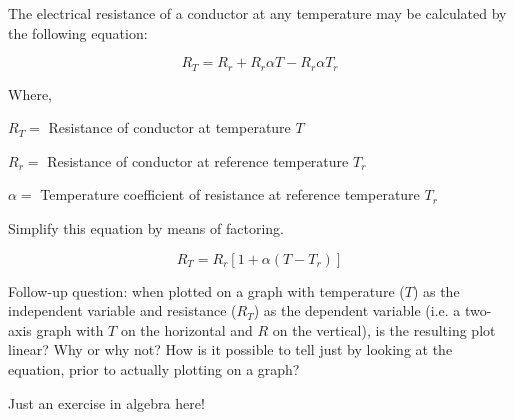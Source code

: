 

The electrical resistance of a conductor at any temperature may be calculated by the following equation:

$$R_T = R_r + R_r \alpha T - R_r \alpha T_r$$

\noindent
Where,

$R_T =$ Resistance of conductor at temperature $T$

$R_r =$ Resistance of conductor at reference temperature $T_r$

$\alpha =$ Temperature coefficient of resistance at reference temperature $T_r$

\vskip 10pt

Simplify this equation by means of factoring.







$$R_T = R_r [1 + \alpha(T - T_r)]$$

\vskip 10pt

Follow-up question: when plotted on a graph with temperature ($T$) as the independent variable and resistance ($R_T$) as the dependent variable (i.e. a two-axis graph with $T$ on the horizontal and $R$ on the vertical), is the resulting plot linear?  Why or why not?  How is it possible to tell just by looking at the equation, prior to actually plotting on a graph?







Just an exercise in algebra here!





